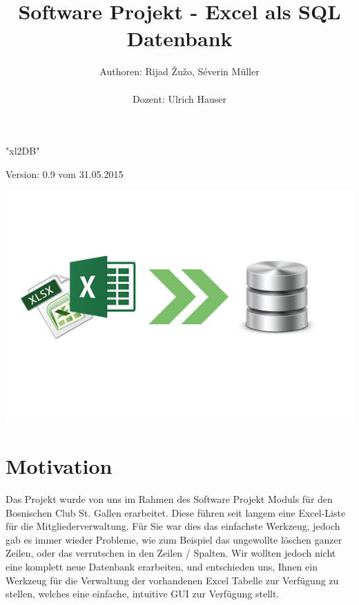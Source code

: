 \documentclass{article}
\begin{document}
\begin{titlepage}


\title{\vspace{20mm}\Huge Software Projekt - Excel als SQL Datenbank}
\author{Authoren: Rijad \v{Z}u\v{z}o, Séverin Müller \\ \\ Dozent: Ulrich Hauser}



\date{} 
\clearpage\maketitle
\thispagestyle{empty}

\vspace{60mm}
\centering \huge "xl2DB"

\centering \normalsize Version: 0.9 vom 31.05.2015
\begin{center}
		\includegraphics[width=0.8 \textwidth]{SoftwareLogo}
\end{center}

\end{titlepage}
\newpage
\tableofcontents
\vspace{-5mm}
\listoffigures
\newpage



\section{Motivation}
Das Projekt wurde von uns im Rahmen des Software Projekt Moduls für den Bosnischen Club St. Gallen erarbeitet. Diese führen seit langem eine Excel-Liste für die Mitgliederverwaltung. \newline 
Für Sie war dies das einfachste Werkzeug, jedoch gab es immer wieder Probleme, wie zum Beispiel das ungewollte löschen ganzer Zeilen, oder das verrutschen in den Zeilen / Spalten. Wir wollten jedoch nicht eine komplett neue Datenbank erarbeiten, und entschieden uns, Ihnen ein Werkzeug für die Verwaltung der vorhandenen Excel Tabelle zur Verfügung zu stellen, welches eine einfache, intuitive GUI zur Verfügung stellt.
\end{document}
